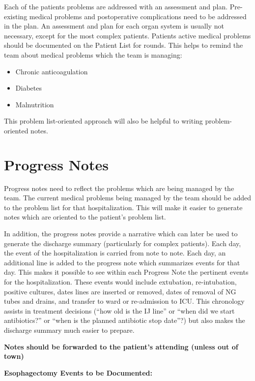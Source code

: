 \documentclass[
]{book}
\providecommand{\tightlist}{%
  \setlength{\itemsep}{0pt}\setlength{\parskip}{0pt}}
\begin{document}
Each of the patients problems are addressed with an assessment and plan. Pre-existing medical problems and postoperative complications need to be addressed in the plan. An assessment and plan for each organ system is usually not necessary, except for the most complex patients. Patients active medical problems should be documented on the Patient List for rounds. This helps to remind the team about medical problems which the team is managing:

\begin{itemize}
\tightlist
\item
  Chronic anticoagulation
\item
  Diabetes
\item
  Malnutrition
\end{itemize}

This problem list-oriented approach will also be helpful to writing problem-oriented notes.

\hypertarget{progress-notes}{%
\chapter{Progress Notes}\label{progress-notes}}

Progress notes need to reflect the problems which are being managed by the team. The current medical problems being managed by the team should be added to the problem list for that hospitalization. This will make it easier to generate notes which are oriented to the patient's problem list.

In addition, the progress notes provide a narrative which can later be used to generate the discharge summary (particularly for complex patients). Each day, the event of the hospitalization is carried from note to note. Each day, an additional line is added to the progress note which summarizes events for that day. This makes it possible to see within each Progress Note the pertinent events for the hospitalization. These events would include extubation, re-intubation, positive cultures, dates lines are inserted or removed, dates of removal of NG tubes and drains, and transfer to ward or re-admission to ICU. This chronology assists in treatment decisions (``how old is the IJ line'' or ``when did we start antibiotics?'' or ``when is the planned antibiotic stop date''?) but also makes the discharge summary much easier to prepare.

\textbf{Notes should be forwarded to the patient's attending (unless out of town)}

\textbf{Esophagectomy Events to be Documented:}
\end{document}
